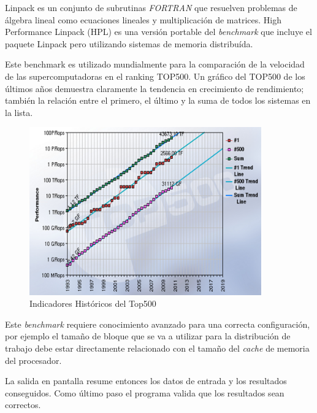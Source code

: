 \documentclass[a4paper]{report}
\begin{document}
Linpack \cite{linpack} es un conjunto de subrutinas {\it FORTRAN} que resuelven
problemas de \'algebra lineal como ecuaciones lineales y multiplicaci\'on de
matrices. High Performance Linpack (HPL) \cite{hpl} es una versi\'on portable del {\it benchmark} que incluye
el paquete Linpack pero utilizando sistemas de memoria distribu\'ida.

\bigskip

Este benchmark es utilizado mundialmente para la comparaci\'on de la
velocidad de las supercomputadoras en el ranking TOP500. 
Un gr\'afico del TOP500 de los \'ultimos a\~nos demuestra claramente la
tendencia en crecimiento de rendimiento; tambi\'en la relaci\'on entre el primero,
el \'ultimo y la suma de todos los sistemas en la lista.

\begin{figure}[H]
\begin{center}
\includegraphics[width=10cm]{top500.png}
\caption{Indicadores Hist\'oricos del Top500}
\end{center}
\end{figure}

Este {\it benchmark} requiere conocimiento avanzado para una correcta configuraci\'on,
por ejemplo el tama\~no de bloque que se va a utilizar para la distribuci\'on de trabajo
debe estar directamente relacionado con el tama\~no del {\it cache} de memoria del procesador.

\bigskip

La salida en pantalla resume entonces los datos de entrada y los resultados conseguidos.
Como \'ultimo paso el programa valida que los resultados sean correctos.
\end{document}
